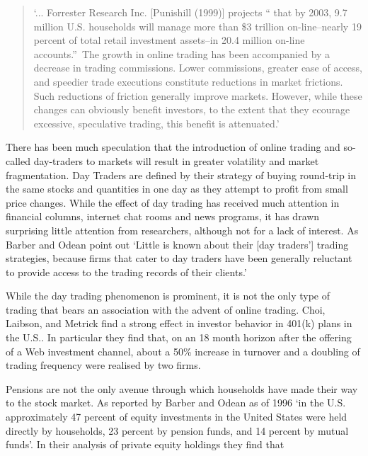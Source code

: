 \documentclass{ucthesis}
\begin{document}
\begin{quote}
`... Forrester Research Inc. [Punishill (1999)] projects \textquotedblleft
that by 2003, 9.7 million U.S. households will manage more than \$3 trillion
on-line--nearly 19 percent of total retail investment assets--in 20.4
million on-line accounts.\textquotedblright\ The growth in online trading
has been accompanied by a decrease in trading commissions. Lower
commissions, greater ease of access, and speedier trade executions
constitute reductions in market frictions. Such reductions of friction
generally improve markets. However, while these changes can obviously
benefit investors, to the extent that they ecourage excessive, speculative
trading, this benefit is attenuated.' \cite[pp. 456]{Barber 2002}
\end{quote}

There has been much speculation that the introduction of online trading and
so-called day-traders to markets will result in greater volatility and
market fragmentation. Day Traders are defined by their strategy of buying
round-trip in the same stocks and quantities in one day as they attempt to
profit from small price changes. While the effect of day trading has
received much attention in financial columns, internet chat rooms and news
programs, it has drawn surprising little attention from researchers,
although not for a lack of interest. As Barber and Odean \cite[2001]{Barber
2001} point out `Little is known about their [day traders'] trading
strategies, because firms that cater to day traders have been generally
reluctant to provide access to the trading records of their clients.'\cite[%
pp51]{Barber 2001}

While the day trading phenomenon is prominent, it is not the only type of
trading that bears an association with the advent of online trading. Choi,
Laibson, and Metrick \cite[2001, pp. 419]{Choi 2001} find a strong effect in
investor behavior in 401(k) plans in the U.S.. In particular they find that,
on an 18 month horizon after the offering of a Web investment channel, about
a 50\% increase in turnover and a doubling of trading frequency were
realised by two firms.

Pensions are not the only avenue through which households have made their
way to the stock market. As reported by Barber and Odean \cite[2000, pp. 773]%
{Barber 2000} as of 1996 `in the U.S. approximately 47 percent of equity
investments in the United States were held directly by households, 23
percent by pension funds, and 14 percent by mutual funds'. In their analysis
of private equity holdings they find that
\end{document}

